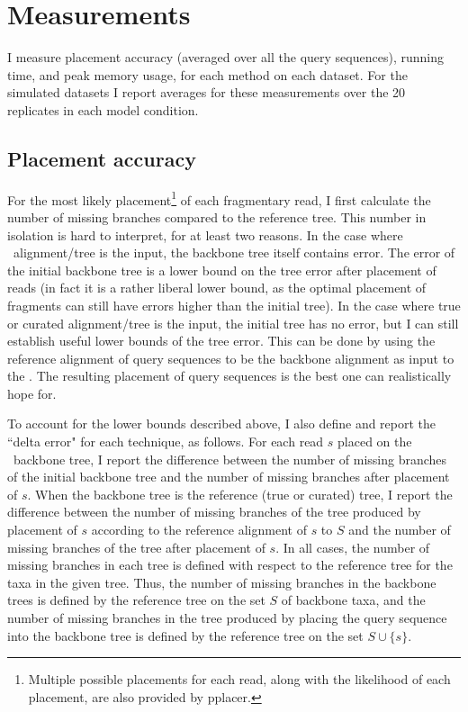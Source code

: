 \section{Measurements}
I measure placement accuracy (averaged over
all the query sequences),  running time,
and peak memory usage, for each method on each dataset.
For the simulated datasets I report averages for these
measurements over the 20 replicates in each model
condition.  

\subsection{Placement accuracy}
For the most likely
placement\footnote{Multiple possible placements for
each read, along with the likelihood of each placement,
are also provided by pplacer.} of each fragmentary
read, I first calculate the number of missing branches compared to the 
reference tree. 
This number in isolation is hard to interpret, for at least two reasons.
In the case where \sate~alignment/tree is the input, the backbone tree itself
contains error. The error of the initial backbone tree is a lower bound on the
tree error after placement of reads (in fact it is a rather liberal lower bound,
as the optimal placement of fragments can still have errors higher than the
initial tree).
In the case where true or curated alignment/tree is 
the input, the initial tree has no
error, but I can still establish useful lower bounds of the tree error. 
This can be done by using the reference alignment of query sequences 
to be the backbone alignment as input to the \pplacer. 
The resulting placement of query sequences
is the best one can realistically hope for.

To account for the lower bounds described above,
I also define and report 
the ``delta error" for each technique,  as follows.
For each read $s$ placed on the \sate~backbone tree, 
I report the difference between
the number of missing branches of the initial 
backbone tree 
and the number of missing branches after placement of $s$.
When the backbone tree is 
the reference (true or curated) tree, 
I report the
difference between the number of missing branches of the tree produced by
placement of $s$ according to the 
reference alignment of $s$ to $S$ and 
the number of missing branches
of the tree after placement of $s$.
In all cases, 
the number of missing branches in each tree is defined with
respect to the reference tree for the taxa in the given tree.
Thus, the number of missing branches in the backbone trees is
defined by the reference tree on the set $S$ of backbone taxa, and the
number of missing branches in the tree produced by placing the
query sequence into the backbone tree is defined by the
reference tree on the set $S \cup \{s\}$.



